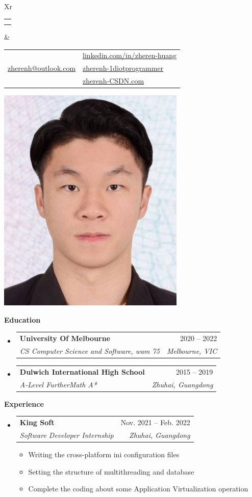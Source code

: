 \documentclass[letterpaper,12pt]{article}[leftmargin=*]
\makeatletter
\def \fullname {Zheren Huang}
\def \subtitle {}
\def \linkedinicon {\faLinkedin}
\def \linkedinlink {https://linkedin.com/in/zheren-huang-9133a6235/}
\def \linkedintext {linkedin.com/in/zheren-huang}
\def \phoneicon {\faPhone}
\def \phonetext {+61 466641756}
\def \emailicon {\faEnvelope}
\def \emaillink {mailto:zherenh@outlook.com}
\def \emailtext {zherenh@outlook.com}
\def \githubicon {\faGithub}
\def \githublink {https://github.com/1diotprogrammer}
\def \githubtext {zherenh-1diotprogrammer}
\def \websiteicon {\faGlobe}
\def \websitelink {https://blog.csdn.net/ooooobx?spm=1000.2115.3001.5343}
\def \websitetext {zherenh-CSDN.com}
\def \headertype {\doublecol}
\def \entryspacing {-0pt}
\def \linkedin {\linkedinicon \hspace{3pt}\href{\linkedinlink}{\linkedintext}}
\def \phone {\phoneicon \hspace{3pt}{ \phonetext}}
\def \email {\emailicon \hspace{3pt}\href{\emaillink}{\emailtext}}
\def \github {\githubicon \hspace{3pt}\href{\githublink}{\githubtext}}
\def \website {\websiteicon \hspace{3pt}\href{\websitelink}{\websitetext}}
\renewcommand{\section}[2]{\vspace{5pt}
  \colorbox{secondary}{\color{white}\raggedbottom\normalsize\textbf{{#1}{\hspace{7pt}#2}}}
}
\newcommand{\resumeEntryStart}{\begin{itemize}[leftmargin=2.5mm]}
\newcommand{\resumeEntryEnd}{\end{itemize}\vspace{\entryspacing}}
\newcommand{\resumeItemListStart}{\begin{itemize}[leftmargin=4.5mm]}
\newcommand{\resumeItemListEnd}{\end{itemize}}
\newcommand{\resumeItem}[1]{
  \item\small{
    {#1 \vspace{-2pt}}
  }
}
\newcommand{\resumeEntryTSDL}[4]{
  \vspace{-1pt}\item[]
    \begin{tabularx}{0.97\textwidth}{X@{\hspace{60pt}}r}
      \textbf{\color{primary}#1} & {\firabook\color{accent}\small#2} \\
      \textit{\color{accent}\small#3} & \textit{\color{accent}\small#4} \\
    \end{tabularx}\vspace{-6pt}
}
\newcommand{\doublecol}[6]{
  \begin{tabularx}{\textwidth}{Xr}
    {
      \begin{tabular}[c]{l}
        \fontsize{35}{45}\selectfont{\color{primary}{{\textbf{\fullname}}}} \\
        {\textit{\subtitle}} 
      \end{tabular}
    } & {
      \begin{tabular}[c]{l@{\hspace{1.5em}}l}
        {\small#4} & {\small#1} \\
        {\small#5} & {\small#2} \\
        {\small#6} & {\small#3}
      \end{tabular}
    }
  \end{tabularx}
}
\makeatother
\begin{document}
\headertype{\linkedin}{\github}{\website}{\phone}{\email}{} 
\vspace{-10pt}  

  \includegraphics[scale=0.4]{IDPhoto.jpg}

\section{\faGraduationCap}{Education}

  \resumeEntryStart
    \resumeEntryTSDL
      {University Of Melbourne}{2020 -- 2022}
      {CS Computer Science and Software, wam 75}{Melbourne, VIC}
  \resumeEntryEnd
  
  \resumeEntryStart
    \resumeEntryTSDL
      {Dulwich International High School}{2015 -- 2019}
      {A-Level FurtherMath A*}{Zhuhai, Guangdong}
  \resumeEntryEnd


\section{\faPieChart}{Experience}

  \resumeEntryStart
    \resumeEntryTSDL
      {King Soft}{Nov. 2021 -- Feb. 2022}
      {Software Developer Internship}{Zhuhai, Guangdong}
    \resumeItemListStart
      \resumeItem {Writing the cross-platform ini configuration files}
      \resumeItem {Setting the structure of multithreading and database}
      \resumeItem {Complete the coding about some Application Virtualization operation}
    \resumeItemListEnd
  \resumeEntryEnd
  
\end{document}
